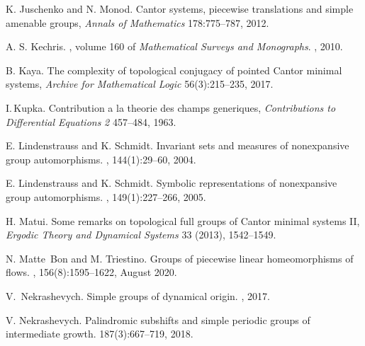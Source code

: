 \documentclass{article}
\theoremstyle{definition}
\begin{document}
\begin{thebibliography}{99}
K. Juschenko and N. Monod. Cantor systems, piecewise translations and simple amenable groups, {\em Annals of Mathematics} 178:775--787, 2012.

	
	
	A. S. Kechris.
	, volume 160 of {\em
		Mathematical {{Surveys}} and {{Monographs}}}.
	, 2010.

B. Kaya. The complexity of topological conjugacy of pointed Cantor minimal systems, {\em Archive for Mathematical Logic} 56(3):215--235, 2017.

 I.\,Kupka.
Contribution a la theorie des champs generiques,
{\it Contributions to Differential Equations} {\em2} 457--484, 1963.

E. Lindenstrauss and K. Schmidt.
\newblock Invariant sets and measures of nonexpansive group automorphisms.
, 144(1):29--60, 2004.

E. Lindenstrauss and K. Schmidt.
\newblock Symbolic representations of nonexpansive group automorphisms.
, 149(1):227--266, 2005.

H. Matui. Some remarks on topological full groups of Cantor minimal systems II, {\em Ergodic Theory and Dynamical Systems} 33 (2013), 1542--1549.

	

	
	N. Matte~Bon and M. Triestino.
	\newblock Groups of piecewise linear homeomorphisms of flows.
	, 156(8):1595--1622, August 2020.
	
	V.~Nekrashevych.
	\newblock Simple groups of dynamical origin.
	, 2017.
	
	V. Nekrashevych.
	\newblock Palindromic subshifts and simple periodic groups of intermediate
	growth.
	 187(3):667--719, 2018.


\end{thebibliography}
\end{document}
